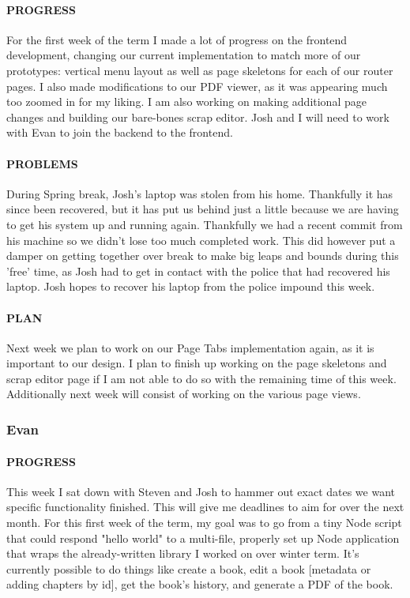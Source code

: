 \documentclass[onecolumn, draftclsnofoot,10pt, compsoc]{IEEEtran}
\begin{document}
	\paragraph{PROGRESS}
	For the first week of the term I made a lot of progress on the frontend development, changing our current implementation to match more of our prototypes: vertical menu layout as well as page skeletons for each of our router pages. I also made modifications to our PDF viewer, as it was appearing much too zoomed in for my liking. I am also working on making additional page changes and building our bare-bones scrap editor. Josh and I will need to work with Evan to join the backend to the frontend.
	
	\paragraph{PROBLEMS}
	During Spring break, Josh's laptop was stolen from his home. Thankfully it has since been recovered, but it has put us behind just a little because we are having to get his system up and running again. Thankfully we had a recent commit from his machine so we didn't lose too much completed work. This did however put a damper on getting together over break to make big leaps and bounds during this 'free' time, as Josh had to get in contact with the police that had recovered his laptop. Josh hopes to recover his laptop from the police impound this week.
	
	\paragraph{PLAN}
	Next week we plan to work on our Page Tabs implementation again, as it is important to our design. I plan to finish up working on the page skeletons and scrap editor page if I am not able to do so with the remaining time of this week. Additionally next week will consist of working on the various page views.
	
	
	\subsubsection{Evan}
	
	\paragraph{PROGRESS}
	This week I sat down with Steven and Josh to hammer out exact dates we want specific functionality finished. This will give me deadlines to aim for over the next month. For this first week of the term, my goal was to go from a tiny Node script that could respond "hello world" to a multi-file, properly set up Node application that wraps the already-written library I worked on over winter term. It's currently possible to do things like create a book, edit a book [metadata or adding chapters by id], get the book's history, and generate a PDF of the book.
	
\end{document}
